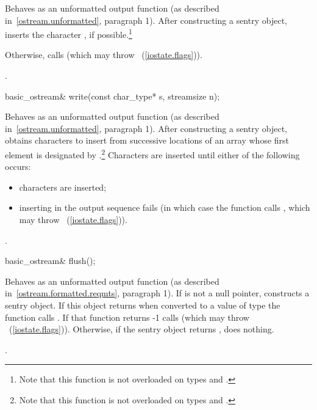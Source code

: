 \begin{itemdescr}
\pnum
\effects
Behaves as an unformatted output function (as described in~\ref{ostream.unformatted}, paragraph 1).
After constructing a sentry
object, inserts
the character , if possible.\footnote{Note that this function is not overloaded on types
and
.}

\pnum
Otherwise, calls
(which may throw
~(\ref{iostate.flags})).

\pnum
\returns
{}.
\end{itemdescr}

%
\begin{itemdecl}
basic_ostream& write(const char_type* s, streamsize n);
\end{itemdecl}

\begin{itemdescr}
\pnum
\effects
Behaves as an unformatted output function (as described in~\ref{ostream.unformatted}, paragraph 1).  After constructing a sentry
object, obtains
characters to insert from
successive locations of an array whose first element is designated by
.\footnote{Note that this function is not overloaded on types
and
.}
Characters are inserted until either of the following occurs:
\begin{itemize}
\item
{} characters are inserted;
\item
inserting in the output sequence fails
(in which case the function calls
,
which may throw
~(\ref{iostate.flags})).
\end{itemize}

\pnum
\returns
{}.
\end{itemdescr}

%
\begin{itemdecl}
basic_ostream& flush();
\end{itemdecl}

\begin{itemdescr}
\pnum
\effects Behaves as an unformatted output function (as described in~\ref{ostream.formatted.reqmts}, paragraph 1).
If
is not a null pointer,
constructs a sentry object. If this object returns  when converted to a value of type  the function
calls
.
If that function returns -1
calls
(which may throw
~(\ref{iostate.flags})).
Otherwise, if the sentry object returns , does nothing.

\pnum
\returns
{}.
\end{itemdescr}

